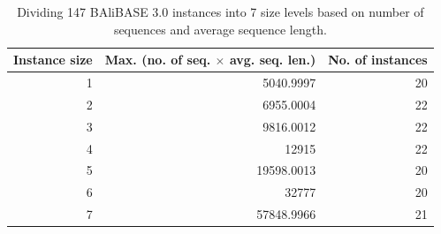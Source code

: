 \begin{table}[htbp]
	\centering
	\caption{Dividing 147 BAliBASE 3.0 instances into 7 size levels based on number of sequences and average sequence length.}
	\begin{tabular}{r|r|r}
		\multicolumn{1}{l|}{Instance size} & \multicolumn{1}{l|}{Max. (no. of seq. $\times$ avg. seq. len.)} & No. of instances\\
		\hline
		1     & 5040.9997 & 20 \\
		\hline
		2     & 6955.0004 & 22 \\
		\hline
		3     & 9816.0012 & 22 \\
		\hline
		4     & 12915 & 22 \\
		\hline
		5     & 19598.0013 & 20 \\
		\hline
		6     & 32777 & 20 \\
		\hline
		7     & 57848.9966 & 21\\
		\hline
	\end{tabular}%
	\label{tab:data-size}%
\end{table}%

